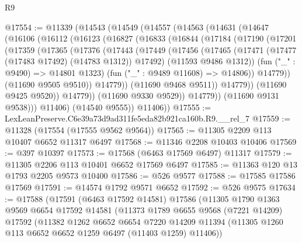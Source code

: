 \begin{lexlean}{R9}
\begin{coremodule}
@17554 := @11339
    (@14543
      (@14549
        (@14557
          (@14563
            (@14631
              (@14647
                (@16106
                  (@16112
                    (@16123
                      (@16827
                        (@16833
                          (@16844
                            (@17184
                              (@17190
                                (@17201
                                  (@17359
                                    (@17365
                                      (@17376
                                        (@17443
                                          (@17449
                                            (@17456
                                              (@17465
                                                (@17471
                                                  (@17477 (@17483 @17492) (@14783 @1312))
                                                  @17492)
                                                (@11593 @9486 @1312))
                                              (fun ("_" : @9490) => @14801 @1323)
                                              (fun ("_" : @9489 @11608) => @14806))
                                            @14779))
                                        (@11690 @9505 @9510))
                                      @14779))
                                  (@11690 @9468 @9511))
                                @14779))
                            (@11690 @9425 @9520))
                          @14779))
                      (@11690 @9330 @9529))
                    @14779))
                (@11690 @9131 @9538)))
            @11406)
          (@14540 @9555))
        @11406))
@17555 := LexLeanPreserve.C6e39a73d9ad311fe5eda82b921ca160b.R9.__rel_7
@17559 := @11328 (@17554 (@17555 @9562 @9564))
@17565 := @11305 @2209 @113 @10407 @6652 @11317 @6497
@17568 := @11346 @2208 @10403 @10406
@17569 := @397 @10397
@17573 := @17568 (@6463 @17569 @6497) @11317
@17579 := @11305 @2206 @113 @10401 @6652 @17569 @6497
@17585 := @11363 @120 @13 @1793 @2205 @9573 @10400
@17586 := @526 @9577
@17588 := @17585 @17586 @17569
@17591 := @14574 @1792 @9571 @6652
@17592 := @526 @9575
@17634 := @17588
    (@17591
      (@6463 @17592 @14581)
      @17586
      (@11305
        @1790
        @1363
        @9569
        @6654
        @17592
        @14581
        (@11373
          @1789
          @6655
          @9568
          (@7221 @14209)
          @17592
          (@11382
            @1262
            @6652
            @6654
            @7220
            @14209
            @11394
            (@11305 @1260 @113 @6652 @6652 @1259 @6497 (@11403 @1259) @11406))

\end{coremodule}
\end{lexlean}
